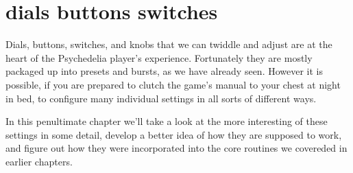 \chapter{dials buttons switches} 
\label{sec:dials}
Dials, buttons, switches, and knobs that we can twiddle and adjust are at the heart of the 
Psychedelia player's experience. Fortunately they are mostly packaged up into presets and bursts,
as we have already seen. However it is possible, if you are prepared to clutch the game's manual
to your chest at night in bed, to configure many individual settings in all sorts of different ways.

In this penultimate chapter we'll take a look at the more interesting of these settings in some detail, develop
a better idea of how they are supposed to work, and figure out how they were incorporated into the core routines
we covereded in earlier chapters.

